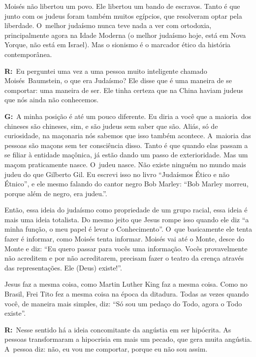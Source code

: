 Moisés não libertou um povo. Ele libertou um bando de escravos. Tanto é
que junto com os judeus foram também muitos egípcios, que resolveram
optar pela liberdade. O~melhor judaísmo nunca teve nada a ver com
ortodoxia, principalmente agora na Idade Moderna (o melhor judaísmo
hoje, está em Nova Yorque, não está em Israel). Mas o sionismo é o
marcador ético da história contemporânea.

 

\textbf{R:}~Eu perguntei uma vez a uma pessoa muito inteligente chamado
Moisés\textbf{}~Baumstein, o que era Judaísmo? Ele disse que é uma
maneira de se comportar: uma maneira de ser. Ele tinha certeza que na
China haviam judeus que nós ainda não conhecemos.

 

\textbf{G:}~A minha posição é até um pouco diferente. Eu diria a você
que a maioria\textbf{}~dos chineses são chineses, sim, e são judeus sem
saber que são. Aliás, só de curiosidade, na maçonaria nós sabemos que
isso também acontece. A~maioria das pessoas são maçons sem ter
consciência disso. Tanto é que quando elas passam a se filiar à
entidade maçônica, já estão dando um passo de exterioridade. Mas um
maçom praticamente nasce. O~judeu nasce. Não existe ninguém no mundo
mais judeu do que Gilberto Gil. Eu escrevi isso no livro ``Judaísmos
Ético e não Étnico'', e ele mesmo falando do cantor negro Bob Marley:
``Bob Marley morreu, porque além de negro, era judeu.''.

 

Então, essa ideia do judaísmo como propriedade de um grupo racial, essa
ideia é mais uma ideia totalista. Do mesmo jeito que Jesus rompe isso
quando ele diz ``a minha função, o meu papel é levar o Conhecimento''. O~que basicamente ele tenta fazer é informar, como Moisés tenta informar.
Moisés vai até o Monte, desce do Monte e diz: ``Eu quero passar para
vocês uma informação. Vocês provavelmente não acreditem e por não
acreditarem, precisam fazer o teatro da crença através das
representações. Ele (Deus) existe!''.

 

Jesus faz a mesma coisa, como Martin Luther King faz a mesma coisa. Como
no Brasil, Frei Tito fez a mesma coisa na época da ditadura. Todas as
vezes quando você, de maneira mais simples, diz: ``Só sou um pedaço do
Todo, agora o Todo existe''.

 

\textbf{R:}~Nesse sentido há a ideia concomitante da angústia em ser
hipócrita. As pessoas transformaram a hipocrisia em mais um pecado, que
gera muita angústia. A~pessoa diz: não, eu vou me comportar, porque eu
não sou assim.


